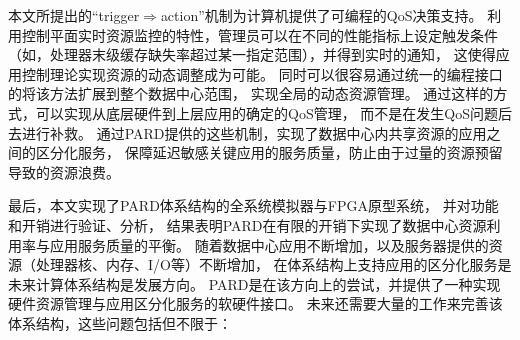 本文所提出的``trigger$\Rightarrow$action''机制为计算机提供了可编程的QoS决策支持。
利用控制平面实时资源监控的特性，管理员可以在不同的性能指标上设定触发条件
（如，处理器末级缓存缺失率超过某一指定范围），并得到实时的通知，
这使得应用控制理论实现资源的动态调整成为可能。
同时可以很容易通过统一的编程接口的将该方法扩展到整个数据中心范围，
实现全局的动态资源管理。
通过这样的方式，可以实现从底层硬件到上层应用的确定的QoS管理，
而不是在发生QoS问题后去进行补救。
通过PARD提供的这些机制，实现了数据中心内共享资源的应用之间的区分化服务，
保障延迟敏感关键应用的服务质量，防止由于过量的资源预留导致的资源浪费。

最后，本文实现了PARD体系结构的全系统模拟器与FPGA原型系统，
并对功能和开销进行验证、分析，
结果表明PARD在有限的开销下实现了数据中心资源利用率与应用服务质量的平衡。
随着数据中心应用不断增加，以及服务器提供的资源（处理器核、内存、I/O等）不断增加，
在体系结构上支持应用的区分化服务是未来计算体系结构是发展方向。
PARD是在该方向上的尝试，并提供了一种实现硬件资源管理与应用区分化服务的软硬件接口。
未来还需要大量的工作来完善该体系结构，这些问题包括但不限于：


